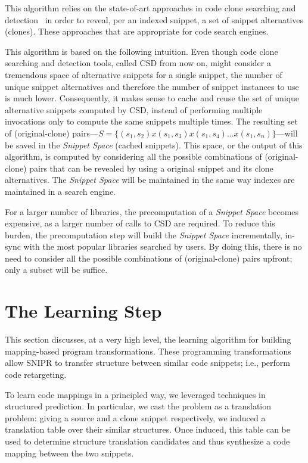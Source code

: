 This algorithm relies on the state-of-art approaches in code clone searching and detection~\cite{Jiang:2007cj, Roh:2010ts} in order to reveal, per an indexed snippet, a set of snippet alternatives (clones). These approaches that are appropriate for code search engines.

This algorithm is based on the following intuition. Even though code clone searching and detection tools, called CSD from now on, might consider a tremendous space of alternative snippets for a single snippet, the number of unique snippet alternatives and therefore the number of snippet instances to use is much lower. Consequently, it makes sense to cache and reuse the set of unique alternative snippets computed by CSD, instead of performing multiple invocations only to compute the same snippets multiple times. The resulting set of (original-clone) pairs---$S = \{(s_1, s_2) x (s_1, s_3) x (s_1, s_4) ... x (s_1, s_n)\}$---will be saved in the \emph{Snippet Space} (cached snippets). This space, or the output of this algorithm, is computed by considering all the possible combinations of (original-clone) pairs that can be revealed by using a original snippet and its clone alternatives. The \emph{Snippet Space} will be maintained in the same way indexes are maintained in a search engine.

For a larger number of libraries, the precomputation of a \emph{Snippet Space} becomes expensive, as a larger number of calls to CSD are required. To reduce this burden, the precomputation step will build the \emph{Snippet Space} incrementally, in-sync with the most popular libraries searched by users. By doing this, there is no need to consider all the possible combinations of (original-clone) pairs upfront; only a subset will be suffice.

\section{The Learning Step}
\label{sec:learning}

This section discusses, at a very high level, the learning algorithm for building mapping-based program transformations. These programming transformations allow \uppercase{SnipR} to transfer structure between similar code snippets; i.e., perform code retargeting.

To learn code mappings in a principled way, we leveraged techniques in structured prediction. In particular, we cast the problem as a translation problem: giving a source and a clone snippet respectively, we induced a translation table over their similar structures. Once induced, this table can be used to determine structure translation candidates and thus synthesize a code mapping between the two snippets. 

